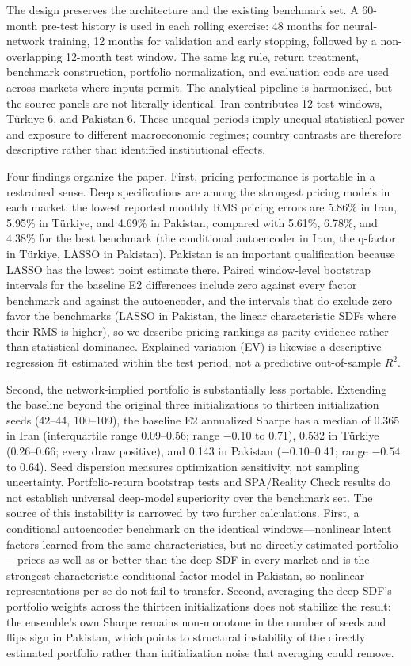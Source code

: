 \documentclass[12pt]{article}
\begin{document}
The design preserves the \citet{cpz2024} architecture and the existing benchmark set. A 60-month pre-test history is used in each rolling exercise: 48 months for neural-network training, 12 months for validation and early stopping, followed by a non-overlapping 12-month test window. The same lag rule, return treatment, benchmark construction, portfolio normalization, and evaluation code are used across markets where inputs permit. The analytical pipeline is harmonized, but the source panels are not literally identical. Iran contributes 12 test windows, T\"urkiye 6, and Pakistan 6. These unequal periods imply unequal statistical power and exposure to different macroeconomic regimes; country contrasts are therefore descriptive rather than identified institutional effects.

Four findings organize the paper. First, pricing performance is portable in a restrained sense. Deep specifications are among the strongest pricing models in each market: the lowest reported monthly RMS pricing errors are 5.86\% in Iran, 5.95\% in T\"urkiye, and 4.69\% in Pakistan, compared with 5.61\%, 6.78\%, and 4.38\% for the best benchmark (the conditional autoencoder in Iran, the q-factor in T\"urkiye, LASSO in Pakistan). Pakistan is an important qualification because LASSO has the lowest point estimate there. Paired window-level bootstrap intervals for the baseline E2 differences include zero against every factor benchmark and against the autoencoder, and the intervals that do exclude zero favor the benchmarks (LASSO in Pakistan, the linear characteristic SDFs where their RMS is higher), so we describe pricing rankings as parity evidence rather than statistical dominance. Explained variation (EV) is likewise a descriptive regression fit estimated within the test period, not a predictive out-of-sample $R^2$.

Second, the network-implied portfolio is substantially less portable. Extending the baseline beyond the original three initializations to thirteen initialization seeds (42--44, 100--109), the baseline E2 annualized Sharpe has a median of 0.365 in Iran (interquartile range 0.09--0.56; range $-0.10$ to 0.71), 0.532 in T\"urkiye (0.26--0.66; every draw positive), and 0.143 in Pakistan ($-0.10$--0.41; range $-0.54$ to 0.64). Seed dispersion measures optimization sensitivity, not sampling uncertainty. Portfolio-return bootstrap tests and SPA/Reality Check results do not establish universal deep-model superiority over the benchmark set. The source of this instability is narrowed by two further calculations. First, a conditional autoencoder benchmark on the identical windows---nonlinear latent factors learned from the same characteristics, but no directly estimated portfolio---prices as well as or better than the deep SDF in every market and is the strongest characteristic-conditional factor model in Pakistan, so nonlinear representations per se do not fail to transfer. Second, averaging the deep SDF's portfolio weights across the thirteen initializations does not stabilize the result: the ensemble's own Sharpe remains non-monotone in the number of seeds and flips sign in Pakistan, which points to structural instability of the directly estimated portfolio rather than initialization noise that averaging could remove.
\end{document}
